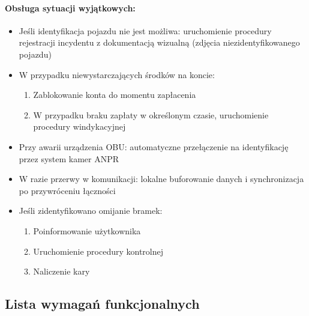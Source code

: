 \documentclass[12pt]{article}
\begin{document}
\paragraph{Obsługa sytuacji wyjątkowych:}
\begin{itemize}
    \item Jeśli identyfikacja pojazdu nie jest możliwa: uruchomienie procedury rejestracji incydentu z dokumentacją wizualną (zdjęcia niezidentyfikowanego pojazdu)
    
    \item W przypadku niewystarczających środków na koncie:
    \begin{enumerate}
        \item Zablokowanie konta do momentu zapłacenia
        \item W przypadku braku zapłaty w określonym czasie, uruchomienie procedury windykacyjnej
    \end{enumerate}
    
    \item Przy awarii urządzenia OBU: automatyczne przełączenie na identyfikację przez system kamer ANPR
    
    \item W razie przerwy w komunikacji: lokalne buforowanie danych i synchronizacja po przywróceniu łączności
    
    \item Jeśli zidentyfikowano omijanie bramek:
    \begin{enumerate}
        \item Poinformowanie użytkownika
        \item Uruchomienie procedury kontrolnej
        \item Naliczenie kary
    \end{enumerate}
\end{itemize}

\subsection{Lista wymagań funkcjonalnych}
\end{document}
